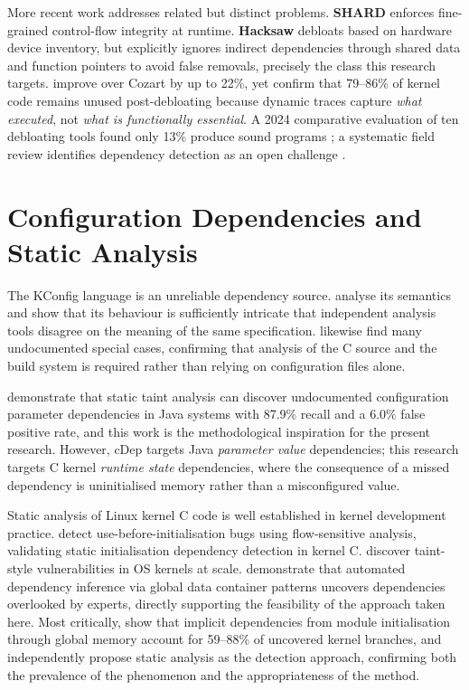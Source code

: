 \documentclass[12pt, a4paper, oneside]{book}
\begin{document}
More recent work addresses related but distinct problems. \textbf{SHARD}
\citep{abubakar2021shard} enforces fine-grained control-flow integrity at runtime.
\textbf{Hacksaw} \citep{hu2023hacksaw} debloats based on hardware device inventory,
but explicitly ignores indirect dependencies through shared data and function
pointers to avoid false removals, precisely the class this research targets.
\citet{gunasekaran2025lean} improve over Cozart by up to 22\%, yet confirm that
79--86\% of kernel code remains unused post-debloating because dynamic traces
capture \textit{what executed}, not \textit{what is functionally essential}. A
2024 comparative evaluation of ten debloating tools found only 13\% produce sound
programs \citep{brown2024broad}; a systematic field review identifies dependency
detection as an open challenge \citep{alhanahnah2024sok}.

\section{Configuration Dependencies and Static Analysis}

The KConfig language is an unreliable dependency source. \citet{elsharkawy2015kconfig}
analyse its semantics and show that its behaviour is sufficiently intricate that
independent analysis tools disagree on the meaning of the same specification.
\citet{gunasekaran2025lean} likewise find many undocumented special cases,
confirming that analysis of the C source and the build system is required rather
than relying on configuration files alone.

\citet{chen2020cdep} demonstrate that static taint analysis can discover
undocumented configuration parameter dependencies in Java systems with 87.9\%
recall and a 6.0\% false positive rate, and this work is the methodological
inspiration for the present research. However, cDep targets Java \textit{parameter
value} dependencies; this research targets C kernel \textit{runtime state}
dependencies, where the consequence of a missed dependency is uninitialised
memory rather than a misconfigured value.

Static analysis of Linux kernel C code is well established in kernel development
practice. \citet{zhai2020ubitect} detect use-before-initialisation bugs using
flow-sensitive analysis, validating static initialisation dependency detection in
kernel C. \citet{zhang2021taint} discover taint-style vulnerabilities in OS
kernels at scale. \citet{chen2024syzgen} demonstrate that automated dependency
inference via global data container patterns uncovers dependencies overlooked by
experts, directly supporting the feasibility of the approach taken here. Most
critically, \citet{hao2022demystifying} show that implicit dependencies from
module initialisation through global memory account for 59--88\% of uncovered
kernel branches, and independently propose static analysis as the detection
approach, confirming both the prevalence of the phenomenon and the
appropriateness of the method.
\end{document}
